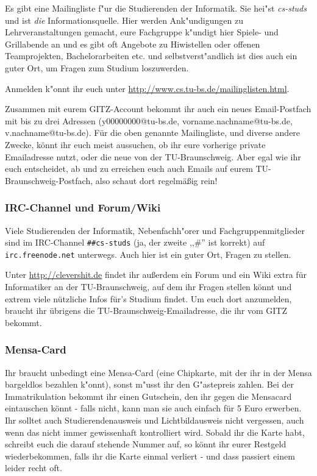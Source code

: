 Es gibt eine Mailingliste f"ur die Studierenden der Informatik.
Sie hei"st \emph{cs-studs} und ist \emph{die} Informationsquelle.
Hier werden Ank"undigungen zu Lehrveranstaltungen gemacht, eure
Fachgruppe k"undigt hier Spiele- und Grillabende an und es gibt
oft Angebote zu Hiwistellen oder offenen Teamprojekten,
Bachelorarbeiten etc. und selbstverst"andlich ist dies auch ein
guter Ort, um Fragen zum Studium loszuwerden.

Anmelden k"onnt ihr euch unter
\url{http://www.cs.tu-bs.de/mailinglisten.html}.

Zusammen mit eurem GITZ-Account bekommt ihr auch ein neues 
Email-Postfach mit bis zu drei Adressen (y00000000@tu-bs.de, 
vorname.nachname@tu-bs.de, v.nachname@tu-bs.de). Für die oben 
genannte Mailingliste, und diverse andere Zwecke, könnt ihr euch 
meist aussuchen, ob ihr eure vorherige private Emailadresse nutzt, 
oder die neue von der TU-Braunschweig. Aber egal wie ihr euch 
entscheidet, ab und zu erreichen euch auch Emails auf eurem 
TU-Braunschweig-Postfach, also schaut dort regelmäßig rein!

\subsubsection{IRC-Channel und Forum/Wiki}

Viele Studierenden der Informatik, Nebenfachh"orer und
Fachgruppenmitglieder sind im IRC-Channel \texttt{\#\#cs-studs}
(ja, der zweite ,,\#'' ist korrekt) auf \texttt{irc.freenode.net}
unterwegs. Auch hier ist ein guter Ort, Fragen zu stellen.

Unter \url{http://clevershit.de} findet ihr außerdem ein Forum und ein 
Wiki extra für Informatiker an der TU-Braunschweig, auf dem ihr Fragen 
stellen könnt und extrem viele nützliche Infos für's Studium findet. Um 
euch dort anzumelden, braucht ihr übrigens die TU-Braunschweig-Emailadresse, 
die ihr vom GITZ bekommt.

\subsubsection{Mensa-Card}

Ihr braucht unbedingt eine Mensa-Card (eine Chipkarte,
mit der ihr in der Mensa bargeldlos bezahlen k"onnt), sonst
m"usst ihr den G"astepreis zahlen. Bei der Immatrikulation bekommt ihr 
einen Gutschein, den ihr gegen die Mensacard eintauschen könnt - falls 
nicht, kann man sie auch einfach für 5 Euro erwerben. Ihr solltet auch 
Studierendenausweis und Lichtbildausweis nicht vergessen, auch wenn 
das nicht immer gewissenhaft kontrolliert wird. Sobald ihr die Karte 
habt, schreibt euch die darauf stehende Nummer auf, so könnt ihr eurer 
Restgeld wiederbekommen, falls ihr die Karte einmal verliert - und dass 
passiert einem leider recht oft.

